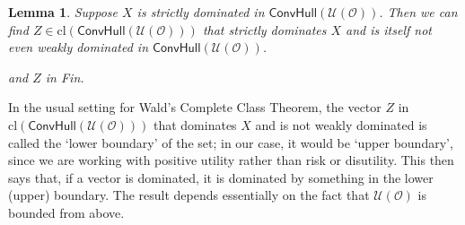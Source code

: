 \documentclass[a4paper,final]{article}
\newtheorem{lemma}[theorem]{Lemma}
\newcommand\cl{\mathrm{cl}}
\renewcommand\O{\mathcal{O}}
\newcommand\Uwald{\mathcal{U}} %
\newcommand{\todoold}[2][]{\todo[backgroundcolor=white,bordercolor=orange!10,linecolor=gray!10, #1,caption={},textcolor=gray]{Pre-rev: #2}}
\newcommand{\Conv}{\mathsf{ConvHull}}
\newenvironment{CCM rewritten}
{\begingroup\color{blue}} %
{\endgroup}              %
\begin{document}
	\begin{lemma}\label{thm:cct:dominator on boundry}
		Suppose $X$ is strictly  dominated in $\Conv(\Uwald(\O))$. Then we can find $Z\in\cl(\Conv(\Uwald(\O)))$ that strictly dominates $X$ and is itself not even weakly dominated in $\Conv(\Uwald(\O))$. \begin{infversion}
			and $Z$ in Fin.
		\end{infversion}
	\end{lemma}
	In the usual setting for Wald's Complete Class Theorem, the vector $Z$ in $\cl(\Conv(\Uwald(\O)))$ that dominates $X$ and is not weakly dominated is called the `lower boundary' of the set; in our case, it would be `upper boundary', since we are working with positive utility rather than risk or disutility. This then says that, if a vector is dominated, it is dominated by something in the lower (upper) boundary. The result depends essentially on the fact that $\Uwald(\O)$ is bounded from above. 
	
\end{document}
